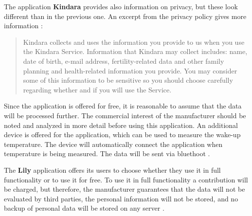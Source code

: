 The application \textbf{Kindara} provides also information on privacy, but these look different than in the previous one. An excerpt from the privacy policy gives more information \cite{kindara}:
\begin{quote}
	Kindara collects and uses the information you provide to us when you use the Kindara Service. Information that Kindara may collect includes: name, date of birth, e-mail address, fertility-related data and other family planning and health-related information you provide. You may consider some of this information to be sensitive so you should choose carefully regarding whether and if you will use the Service.
\end{quote}
Since the application is offered for free, it is reasonable to assume that the data will be processed further. The commercial interest of the manufacturer should be noted and analyzed in more detail before using this application.
An additional device is offered for the application, which can be used to measure the wake-up temperature. The device will automatically connect the application when temperature is being measured. The data will be sent via bluethoot \cite{kindara}.

The \textbf{Lily} application offers its users to choose whether they use it in full functionality or to use it for free.
To use it in full functionality a contribution will be charged, but therefore, the manufacturer guarantees that the data will not be evaluated by third parties, the personal information will not be stored, and no backup of personal data will be stored on any server \cite{lily}.

